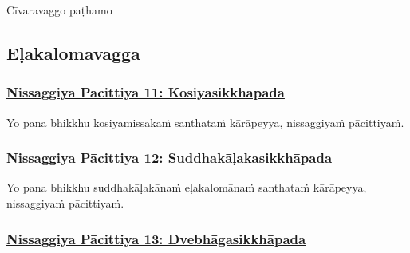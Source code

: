 \begin{center}
	Cīvaravaggo paṭhamo\makeatletter\hyperlink{endnote176-appendix}\makeatother{} \makeatletter\hyperlink{endnote177-appendix}\makeatother{}
\end{center}



\subsection{Eḷakalomavagga}
\label{np-vagga2}

\subsubsection*{\hyperref[forf-exp11]{Nissaggiya Pācittiya 11: Kosiyasikkhāpada}}
\label{np11}

Yo pana bhikkhu kosiyamissakaṁ santhataṁ kārāpeyya, nissaggiyaṁ pācittiyaṁ.



\subsubsection*{\hyperref[forf-exp12]{Nissaggiya Pācittiya 12: Suddhakāḷakasikkhāpada}}
\label{np12}

Yo pana bhikkhu suddhakāḷakānaṁ eḷakalomānaṁ santhataṁ\makeatletter\hyperlink{endnote178-appendix}\makeatother{} kārāpeyya, nissaggiyaṁ pācittiyaṁ.



\subsubsection*{\hyperref[forf-exp13]{Nissaggiya Pācittiya 13: Dvebhāgasikkhāpada}}
\label{np13}

